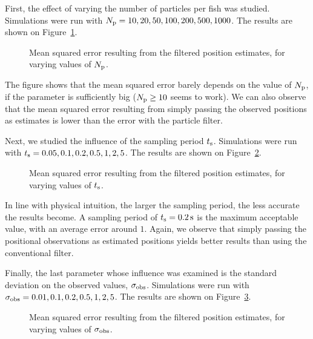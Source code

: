 \documentclass[final]{aomart}
\newtheorem[{}\it]{thm}{Theorem}[section]
\theoremstyle{definition}
\newtheorem*[{}\it]{notation}{Notation}
\numberwithin{equation}{section}
\newcommand{\ts}{t_\textnormal{s}}
\newcommand{\np}{N_\textnormal{p}}
\begin{document}
 First, the effect of varying the number of particles per fish was studied.
 Simulations were run with \(\np = 10, 20, 50, 100, 200, 500, 1000\).
 The results are shown on Figure~\ref{fig:Np}.
 \begin{figure}[!htbp]
 	\centering
 	\scalebox{0.75}{}
 	\caption{Mean squared error resulting from the filtered position estimates, for varying values of \(\np\).}
 	\label{fig:Np}
 \end{figure}
 The figure shows that the mean squared error barely depends on the value of \(\np\), if the parameter is sufficiently big (\(\np \ge 10\) seems to work).
 We can also observe that the mean squared error resulting from simply passing the observed positions as estimates is lower than the error with the particle filter.
 
 Next, we studied the influence of the sampling period \(\ts\).
 Simulations were run with \(\ts = 0.05, 0.1, 0.2, 0.5, 1, 2, 5\).
 The results are shown on Figure~\ref{fig:t_s}.
 \begin{figure}[!htbp]
 	\centering
 	\scalebox{0.75}{}
 	\caption{Mean squared error resulting from the filtered position estimates, for varying values of \(\ts\).}
 	\label{fig:t_s}
 \end{figure}
 In line with physical intuition, the larger the sampling period, the less accurate the results become.
 A sampling period of \(\ts = \SI{0.2}{\second}\) is the maximum acceptable value, with an average error around \(1\).
 Again, we observe that simply passing the positional observations as estimated positions yields better results than using the conventional filter.
 
 Finally, the last parameter whose influence was examined is the standard deviation on the observed values, \(\sigma_\textnormal{obs}\).
 Simulations were run with \(\sigma_{\textnormal{obs}} = 0.01, 0.1, 0.2, 0.5, 1, 2, 5\).
 The results are shown on Figure~\ref{fig:sigma_obs}.
 \begin{figure}[!htbp]
 	\centering
 	\scalebox{0.75}{}
 	\caption{Mean squared error resulting from the filtered position estimates, for varying values of \(\sigma_\textnormal{obs}\).}
 	\label{fig:sigma_obs}
 \end{figure}
 
\end{document}

